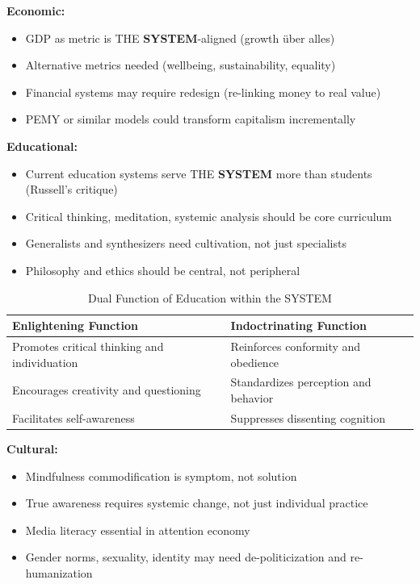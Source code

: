 \documentclass[11pt,a4paper]{article}
\newcommand{\SYSTEM}{\textbf{SYSTEM}}
\theoremstyle{definition}
\theoremstyle{remark}
\begin{document}
\textbf{Economic:}
\begin{itemize}
    \item GDP as metric is THE \SYSTEM{}-aligned (growth über alles)
    \item Alternative metrics needed (wellbeing, sustainability, equality)
    \item Financial systems may require redesign (re-linking money to real value)
    \item PEMY or similar models could transform capitalism incrementally
\end{itemize}

\textbf{Educational:}
\begin{itemize}
    \item Current education systems serve THE \SYSTEM{} more than students (Russell's critique)
    \item Critical thinking, meditation, systemic analysis should be core curriculum
    \item Generalists and synthesizers need cultivation, not just specialists
    \item Philosophy and ethics should be central, not peripheral
\end{itemize}

\begin{table}[h]
\centering
\caption{Dual Function of Education within the SYSTEM}
\label{tab:education_duality}
\begin{tabular}{|l|l|}
\hline
\textbf{Enlightening Function} & \textbf{Indoctrinating Function} \\ \hline
Promotes critical thinking and individuation & Reinforces conformity and obedience \\ \hline
Encourages creativity and questioning & Standardizes perception and behavior \\ \hline
Facilitates self-awareness & Suppresses dissenting cognition \\ \hline
\end{tabular}
\end{table}


\textbf{Cultural:}
\begin{itemize}
    \item Mindfulness commodification is symptom, not solution
    \item True awareness requires systemic change, not just individual practice
    \item Media literacy essential in attention economy
    \item Gender norms, sexuality, identity may need de-politicization and re-humanization
\end{itemize}
\end{document}
